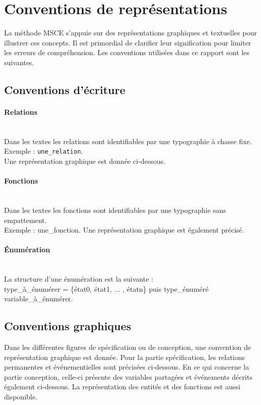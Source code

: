 \section{Conventions de représentations}

La méthode MSCE s'appuie sur des représentations graphiques et textuelles pour illustrer ces concepts. Il est primordial de clarifier leur signification pour limiter les erreurs de compréhension. Les conventions utilisées dans ce rapport sont les suivantes.

\subsection{Conventions d'écriture}

\paragraph{Relations} ~~\\ \noindent
Dans les textes les relations sont identifiables par une typographie à chasse fixe. Exemple : \texttt{une\_relation}.\\
Une représentation graphique est donnée ci-dessous.

\paragraph{Fonctions} ~~\\ \noindent
Dans les textes les fonctions sont identifiables par une typographie sans empattement.\\
Exemple : \textsf{une\_fonction}. Une représentation graphique est également précisé.



\paragraph{Énumération} ~~\\ \noindent
La structure d'une énumération est la suivante :\\
type\_à\_énumérer = \{état0, état1, ... , étatn\} puis type\_énuméré variable\_à\_énumérer.\\


\subsection{Conventions graphiques}

Dans les différentes figures de spécification ou de conception, une convention de représentation graphique est donnée. Pour la partie spécification, les relations permanentes et événementielles sont précisées ci-dessous. En ce qui concerne la partie conception, celle-ci présente des variables partagées et événements décrits également ci-dessous. La représentation des entités et des fonctions est aussi disponible.

